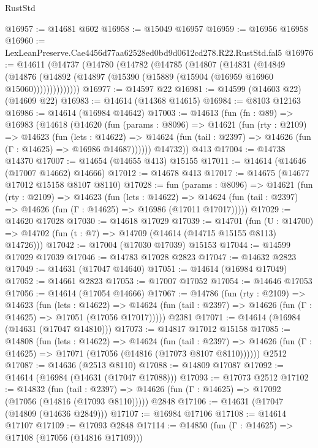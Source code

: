 \begin{lexlean}{RustStd}
\begin{coremodule}
@16957 := @14681 @602
@16958 := @15049 @16957
@16959 := @16956 @16958
@16960 := LexLeanPreserve.Cae4456d77aa62528ed0bd9d0612cd278.R22.RustStd.fal5
@16976 := @14611
    (@14737
      (@14780
        (@14782
          (@14785
            (@14807
              (@14831
                (@14849
                  (@14876
                    (@14892 (@14897 (@15390 (@15889 (@15904 (@16959 @16960 @15060))))))))))))))
@16977 := @14597 @22
@16981 := @14599 (@14603 @22) (@14609 @22)
@16983 := @14614 (@14368 @14615)
@16984 := @8103 @12163
@16986 := @14614 (@16984 @14642)
@17003 := @14613
    (fun (fn : @89) =>
    @16983
      (@14618
        (@14620
          (fun (params : @8096) =>
          @14621
            (fun (rty : @2109) =>
            @14623
              (fun (lets : @14622) =>
              @14624 (fun (tail : @2397) => @14626 (fun (Γ : @14625) => @16986 @14687))))))
        @14732))
    @413
@17004 := @14738 @14370
@17007 := @14654 (@14655 @413) @15155
@17011 := @14614 (@14646 (@17007 @14662) @14666)
@17012 := @14678 @413
@17017 := @14675 (@14677 @17012 @15158 @8107 @8110)
@17028 := fun (params : @8096) =>
  @14621
    (fun (rty : @2109) =>
    @14623
      (fun (lets : @14622) =>
      @14624 (fun (tail : @2397) => @14626 (fun (Γ : @14625) => @16986 (@17011 @17017)))))
@17029 := @14620 @17028
@17030 := @14618 @17029
@17039 := @14701
    (fun (U : @14700) => @14702 (fun (t : @7) => @14709 (@14614 (@14715 @15155 @8113) @14726)))
@17042 := @17004 (@17030 @17039) @15153
@17044 := @14599 @17029 @17039
@17046 := @14783 @17028 @2823
@17047 := @14632 @2823
@17049 := @14631 (@17047 @14640)
@17051 := @14614 (@16984 @17049)
@17052 := @14661 @2823
@17053 := @17007 @17052
@17054 := @14646 @17053
@17056 := @14614 (@17054 @14666)
@17067 := @14786
    (fun (rty : @2109) =>
    @14623
      (fun (lets : @14622) =>
      @14624 (fun (tail : @2397) => @14626 (fun (Γ : @14625) => @17051 (@17056 @17017)))))
    @2381
@17071 := @14614 (@16984 (@14631 (@17047 @14810)))
@17073 := @14817 @17012 @15158
@17085 := @14808
    (fun (lets : @14622) =>
    @14624
      (fun (tail : @2397) =>
      @14626 (fun (Γ : @14625) => @17071 (@17056 (@14816 (@17073 @8107 @8110))))))
    @2512
@17087 := @14636 (@2513 @8110)
@17088 := @14809 @17087
@17092 := @14614 (@16984 (@14631 (@17047 @17088)))
@17093 := @17073 @2512
@17102 := @14832
    (fun (tail : @2397) => @14626 (fun (Γ : @14625) => @17092 (@17056 (@14816 (@17093 @8110)))))
    @2848
@17106 := @14631 (@17047 (@14809 (@14636 @2849)))
@17107 := @16984 @17106
@17108 := @14614 @17107
@17109 := @17093 @2848
@17114 := @14850 (fun (Γ : @14625) => @17108 (@17056 (@14816 @17109)))

\end{coremodule}
\end{lexlean}
